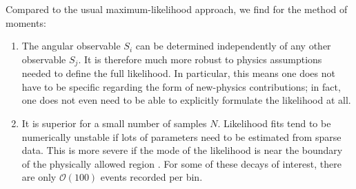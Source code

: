 \documentclass[aps,nofootinbib,preprintnumbers,prd,twocolumn]{revtex4-1}
\newcommand{\order}[1]{\mathcal{O}\left({#1}\right)}
\begin{document}
Compared to the usual maximum-likelihood approach, we find for the method of moments:
\begin{enumerate}
  \item The angular observable ${S_i}$ can be determined
  independently of any other observable ${S_j}$. It is therefore
  much more robust to physics assumptions needed to define the full
  likelihood. In particular, this means one does not have to be
  specific regarding the form of new-physics contributions; in fact,
  one does not even need to be able to explicitly formulate the
  likelihood at all.
\item It is superior for a small number of samples $N$. Likelihood
  fits tend to be numerically unstable if lots of parameters need to
  be estimated from sparse data. This is more severe if the mode of
  the likelihood is near the boundary of the physically allowed
  region \cite{lehmann1998}. For some of these decays of interest, there are only $\order{100}$ events
  recorded per bin.


\end{enumerate}
\end{document}
